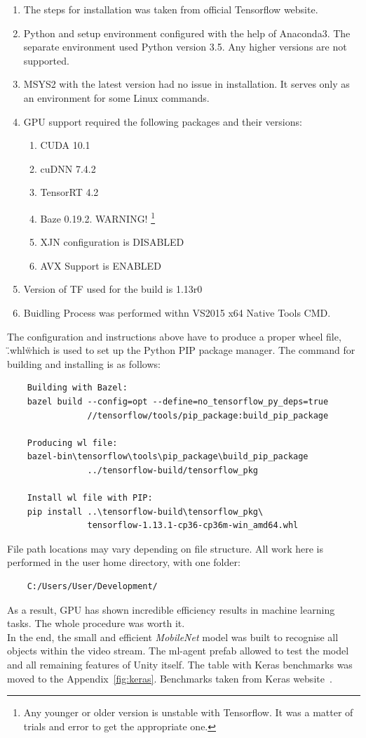 \begin{multicols}{2}
\begin{enumerate}
    \item The steps for installation was taken from official Tensorflow website.\cite{tensorflow_build_2019}
    \item Python and setup environment configured with the help of Anaconda3. The separate environment used Python version 3.5. Any higher versions are not supported.        
    \item MSYS2 with the latest version had no issue in installation. It serves only as an environment for some Linux commands.
    \item GPU support required the following packages and their versions: 
    \begin{enumerate}
        \item CUDA 10.1
        \item cuDNN 7.4.2
        \item TensorRT 4.2
        \item Baze 0.19.2. WARNING! \footnote{Any younger or older version is unstable with Tensorflow. It was a matter of trials and error to get the appropriate one.} 
        \item XJN configuration is DISABLED
        \item AVX Support is ENABLED
    \end{enumerate}        
    \item Version of TF used for the build is 1.13r0
    \item Buidling Process was performed withn VS2015 x64 Native Tools CMD.
\end{enumerate}
\end{multicols}
The configuration and instructions above have to produce a proper wheel file, \".whl\" which is used to set up the Python PIP package manager. 
The command for building and installing is as follows:
\begin{lstlisting}
	Building with Bazel:
	bazel build --config=opt --define=no_tensorflow_py_deps=true
	            //tensorflow/tools/pip_package:build_pip_package
	
	Producing wl file:
	bazel-bin\tensorflow\tools\pip_package\build_pip_package
	            ../tensorflow-build/tensorflow_pkg

	Install wl file with PIP:
	pip install ..\tensorflow-build\tensorflow_pkg\
	            tensorflow-1.13.1-cp36-cp36m-win_amd64.whl
\end{lstlisting}
File path locations may vary depending on file structure. All work here is performed in the user home directory, with one folder:
\begin{lstlisting}
	C:/Users/User/Development/
\end{lstlisting}
As a result, GPU has shown incredible efficiency results in machine learning tasks. The whole procedure was worth it. \\
In the end, the small and efficient \textit{MobileNet} model was built to recognise all objects within the video stream.
The ml-agent prefab allowed to test the model and all remaining features of Unity itself.
The table with Keras benchmarks was moved to the Appendix~\ref{fig:keras}.
Benchmarks taken from Keras website~\cite{noauthor_applications_2018}.
